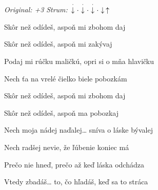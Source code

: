 \begin{song}


\begin{headerbox}
\RaiseBoxWithChucks
\textit{Original: +3} \quad
\textit{Strum:} $\StaccatoDown\Miss\StaccatoDown\Miss\StaccatoDown\Miss\Down\Up$
\end{headerbox}

\begin{hchordbox}
\end{hchordbox}

\Large




\bigskip

Skôr než odídeš,  aspoň mi zbohom daj  \par
Skôr než odídeš, aspoň mi zakývaj \par
Podaj mi rúčku maličkú, opri si o mňa hlavičku \par
Nech ťa na vrelé čielko biele pobozkám \par

\bigskip

Skôr než odídeš,  aspoň mi zbohom daj  \par
Skôr než odídeš, aspoň ma pobozkaj \par
Nech moja nádej naďalej… sníva o láske bývalej \par
Nech radšej nevie, že ľúbenie koniec má \par

\bigskip

Prečo nie hneď, prečo až keď láska odchádza \par
{}Vtedy zbadáš… to, čo hľadáš, keď sa to stráca \par


\end{song}
